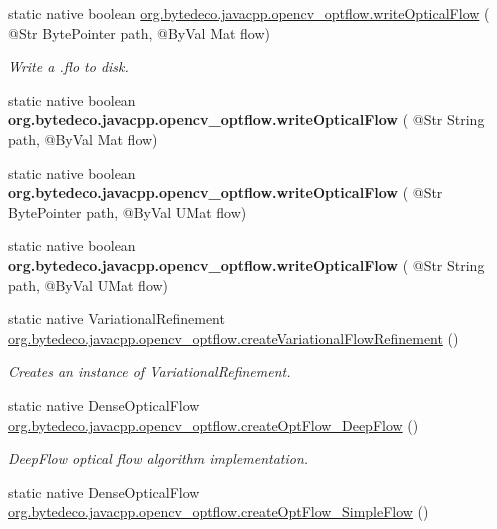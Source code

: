 \begin{DoxyCompactItemize}
\item 
static native boolean \hyperlink{group__optflow_ga41bea8c25211f346782adfb40129e96e}{org.\+bytedeco.\+javacpp.\+opencv\+\_\+optflow.\+write\+Optical\+Flow} ( @Str Byte\+Pointer path, @By\+Val Mat flow)
\begin{DoxyCompactList}\small\item\em Write a .flo to disk. \end{DoxyCompactList}\item 
\mbox{\label{group__optflow_ga2ce63b6527e15bb4e67e704210c41144}} 
static native boolean {\bfseries org.\+bytedeco.\+javacpp.\+opencv\+\_\+optflow.\+write\+Optical\+Flow} ( @Str String path, @By\+Val Mat flow)
\item 
\mbox{\label{group__optflow_ga2f16aacf0d7c356065b7051bc466fc9d}} 
static native boolean {\bfseries org.\+bytedeco.\+javacpp.\+opencv\+\_\+optflow.\+write\+Optical\+Flow} ( @Str Byte\+Pointer path, @By\+Val U\+Mat flow)
\item 
\mbox{\label{group__optflow_ga1aaf6ebff608935e1cfe219216e8196b}} 
static native boolean {\bfseries org.\+bytedeco.\+javacpp.\+opencv\+\_\+optflow.\+write\+Optical\+Flow} ( @Str String path, @By\+Val U\+Mat flow)
\item 
\mbox{\label{group__optflow_ga6d7be52a57f2105050c7a7039ab1af2e}} 
static native Variational\+Refinement \hyperlink{group__optflow_ga6d7be52a57f2105050c7a7039ab1af2e}{org.\+bytedeco.\+javacpp.\+opencv\+\_\+optflow.\+create\+Variational\+Flow\+Refinement} ()
\begin{DoxyCompactList}\small\item\em Creates an instance of Variational\+Refinement. \end{DoxyCompactList}\item 
static native Dense\+Optical\+Flow \hyperlink{group__optflow_ga27f2a261b7f69f4eaaf2aa2552943a1a}{org.\+bytedeco.\+javacpp.\+opencv\+\_\+optflow.\+create\+Opt\+Flow\+\_\+\+Deep\+Flow} ()
\begin{DoxyCompactList}\small\item\em Deep\+Flow optical flow algorithm implementation. \end{DoxyCompactList}\item 
static native Dense\+Optical\+Flow \hyperlink{group__optflow_gace52b781a9780c4c9a20951a2bec314d}{org.\+bytedeco.\+javacpp.\+opencv\+\_\+optflow.\+create\+Opt\+Flow\+\_\+\+Simple\+Flow} ()

\end{DoxyCompactItemize}
